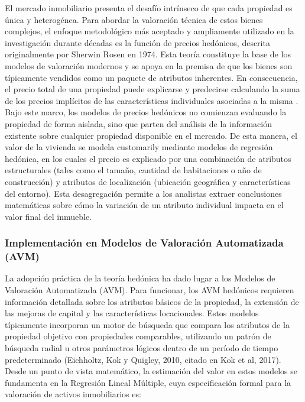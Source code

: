El mercado inmobiliario presenta el desafío intrínseco de que cada propiedad es única y heterogénea. Para abordar la valoración técnica de estos bienes complejos, el enfoque metodológico más aceptado y ampliamente utilizado en la investigación durante décadas es la función de precios hedónicos, descrita originalmente por Sherwin Rosen en 1974. Esta teoría constituye la base de los modelos de valoración modernos y se apoya en la premisa de que los bienes son típicamente vendidos como un paquete de atributos inherentes. En consecuencia, el precio total de una propiedad puede explicarse y predecirse calculando la suma de los precios implícitos de las características individuales asociadas a la misma \parencite{Rosen1974}. Bajo este marco, los modelos de precios hedónicos no comienzan evaluando la propiedad de forma aislada, sino que parten del análisis de la información existente sobre cualquier propiedad disponible en el mercado. De esta manera, el valor de la vivienda se modela customarily mediante modelos de regresión hedónica, en los cuales el precio es explicado por una combinación de atributos estructurales (tales como el tamaño, cantidad de habitaciones o año de construcción) y atributos de localización (ubicación geográfica y características del entorno). Esta desagregación permite a los analistas extraer conclusiones matemáticas sobre cómo la variación de un atributo individual impacta en el valor final del inmueble.

\subsubsection{Implementación en Modelos de Valoración Automatizada (AVM)}

La adopción práctica de la teoría hedónica ha dado lugar a los Modelos de Valoración Automatizada (AVM). Para funcionar, los AVM hedónicos requieren información detallada sobre los atributos básicos de la propiedad, la extensión de las mejoras de capital y las características locacionales. Estos modelos típicamente incorporan un motor de búsqueda que compara los atributos de la propiedad objetivo con propiedades comparables, utilizando un patrón de búsqueda radial u otros parámetros lógicos dentro de un período de tiempo predeterminado (Eichholtz, Kok y Quigley, 2010, citado en Kok et al, 2017). Desde un punto de vista matemático, la estimación del valor en estos modelos se fundamenta en la Regresión Lineal Múltiple, cuya especificación formal para la valoración de activos inmobiliarios es:

